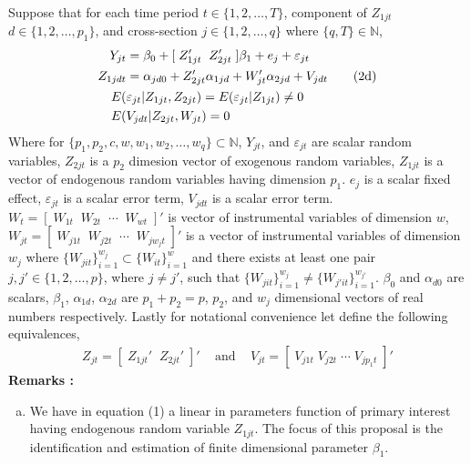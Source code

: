 \documentclass[10pt]{article}
\begin{document}
\noindent Suppose that for each time period $t \in \{1,2, \ldots, T\}$, component of $Z_{1jt}$ $ d\in \{1,2, \ldots , p_1\}$, and cross-section $j \in \{1,2,\ldots, q\}$ where $\{q,T\} \in \mathbb{N}$, 
\begin{align} 
Y_{jt} &= \beta_0 + [\; Z_{1jt}' \;\; Z_{2jt}' \;] \beta_1 + e_j + \varepsilon_{jt} \\
%
Z_{1jdt} &= \alpha_{jd0} + Z_{2jt}' \alpha_{1jd} + W_{jt}' \alpha_{2jd} + V_{jdt} \tag{2d} \\
%
\addtocounter {equation} {1}
E(&\varepsilon_{jt} | Z_{1jt} , Z_{2jt}) = E(\varepsilon_{jt} | Z_{1jt}) \neq 0  \\
%
E(& V_{jdt} | Z_{2jt},W_{jt}) = 0 
%
\end{align}
Where for $\{p_1,p_2,c,w,w_1,w_2, \ldots ,w_q \} \subset \mathbb{N}$, $Y_{jt}$, and $\varepsilon_{jt}$ are scalar random variables, $ Z_{2jt}$ is a $p_2$ dimesion vector of exogenous random variables, $Z_{1jt}$  is a vector of endogenous random variables having dimension $p_1$. $e_j$ is a scalar fixed effect, $\varepsilon_{jt}$ is a scalar error term, $V_{jdt}$ is a scalar error term. $W_t = [ \; W_{1t} \;\; W_{2t} \;\; \cdots \;\; W_{wt} \;]'$ is vector of instrumental variables of dimension $w$, $W_{jt} = [\;W_{j1t} \;\; W_{j2t} \;\; \cdots \;\; W_{jw_jt} \;]'$ is a vector of instrumental variables of dimension $w_j$ where $\{W_{jit}\}_{i=1}^{w_j} \subset \{W_{it}\}_{i=1}^{w}$ and there exists at least one pair $j,j'  \in \{1,2, \ldots , p\}$, where $j \neq j'$, such that $\{W_{jit}\}_{i=1}^{w_j} \neq \{W_{j'it}\}_{i=1}^{w_{j'}}$. $\beta_0$ and $\alpha_{d0}$  are scalars, $\beta_1$, $\alpha_{1d}$, $\alpha_{2d}$ are $p_1 +p_2 = p$, $p_2$, and $w_j$ dimensional vectors of real numbers respectively. Lastly for notational convenience let define the following equivalences, 
\begin{align*} 
Z_{jt} = [\; Z_{1jt}' \;\; Z_{2jt}' \;]'  \;\;\; \text{ and } \;\;\; V_{jt} = [ \; V_{j1t} \; V_{j2t} \; \cdots \;V_{jp_1t}\;]'
\end{align*}
%
\noindent \bf Remarks \rm: 
\begin{enumerate}[a.)] 
 \item We have in equation (1) a linear in parameters function of primary interest having endogenous random variable $Z_{1jt}$. The focus of this proposal is the identification and estimation of finite dimensional parameter $\beta_1$. 

\end{enumerate}
\end{document}
